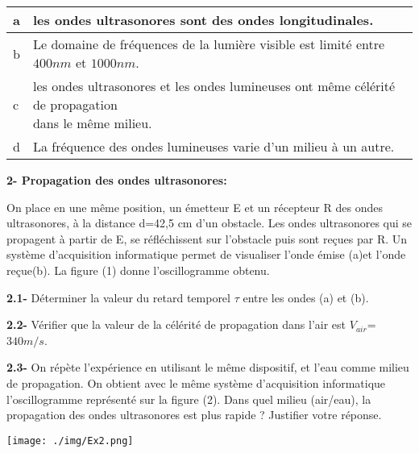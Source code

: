 \documentclass[12pt, french]{article}
\begin{document}
\begin{tabular}{ |l|l| } 
 \hline
a & les ondes ultrasonores sont des ondes longitudinales.   \\\hline
 b & Le domaine de fréquences de la lumière visible est limité entre $400 nm$ et $1000 nm$.  \\\hline
 c & \makecell{les ondes ultrasonores et les ondes lumineuses ont même célérité de propagation\\dans
 le même milieu.}  \\\hline 
 d & La fréquence des ondes lumineuses varie d’un milieu à un autre.  \\\hline 
 \hline
\end{tabular}

\textbf{2- Propagation des ondes ultrasonores:}

On place en une même position, un émetteur E et un récepteur R des ondes ultrasonores, à la
distance d=42,5 cm d’un obstacle. Les ondes ultrasonores qui se propagent à partir de E, se
réfléchissent sur
l’obstacle puis sont reçues par R.
Un système d’acquisition informatique permet de visualiser l’onde émise (a)et l’onde reçue(b).
La figure (1) donne l’oscillogramme obtenu.

\textbf{2.1- }Déterminer la valeur du retard temporel $\tau$ entre les ondes (a) et (b).

\textbf{2.2- }Vérifier que la valeur de la célérité de propagation dans l’air est $V_{air}$=$340 m/s$.

\textbf{2.3- }On répète l’expérience en utilisant le même dispositif, et l’eau comme milieu de
propagation. On obtient avec le même système d’acquisition informatique
l’oscillogramme représenté sur la figure (2). Dans quel milieu (air/eau), la
propagation des ondes ultrasonores est plus rapide ? Justifier votre réponse.

  \begin{center}
	  \vspace{-0.4cm}
	\texttt{[image: ./img/Ex2.png]}
  \end{center}

\end{document}
